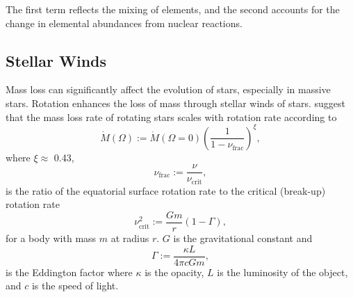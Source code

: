 The first term reflects the mixing of elements, and the second accounts for the change in elemental abundances from nuclear reactions.

\subsection{Stellar Winds}

Mass loss can significantly affect the evolution of stars, especially in massive stars.
Rotation enhances the loss of mass through stellar winds of stars.
\citet{friend_theory_1986, langer_evolution_1991, heger_presupernova_1998} suggest that the mass loss rate of rotating stars scales with rotation rate according to
\begin{equation}
    \Dot{M}(\Omega) := \Dot{M}(\Omega = 0) \left( \frac{1}{1- \nu_{\text{frac}}}\right)^{\xi},
\end{equation}
where $\xi \approx$ 0.43,
\begin{equation}
    \nu_{\text{frac}} := \frac{\nu}{\nu_{\text{crit}}},
\end{equation}
is the ratio of the equatorial surface rotation rate to the critical (break-up) rotation rate
\begin{equation}
    \nu_{\text{crit}}^2 := \frac{G m}{r} \left(1 - \Gamma\right),
\end{equation}
for a body with mass $m$ at radius $r$. $G$ is the gravitational constant and 
\begin{equation}
    \Gamma := \frac{\kappa L}{4 \pi c G m},
\end{equation}
is the Eddington factor where $\kappa$ is the opacity, $L$ is the luminosity of the object, and $c$ is the speed of light.

